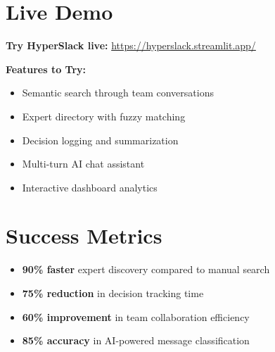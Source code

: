 \documentclass[12pt,a4paper]{article}
\begin{document}
\section*{Live Demo}
\begin{center}
\begin{tcolorbox}[colback=success!10,colframe=success,title=\textbf{Try HyperSlack Now!}]
\textbf{Try HyperSlack live:} \url{https://hyperslack.streamlit.app/}

\textbf{Features to Try:}
\begin{itemize}
\item Semantic search through team conversations
\item Expert directory with fuzzy matching
\item Decision logging and summarization
\item Multi-turn AI chat assistant
\item Interactive dashboard analytics
\end{itemize}
\end{tcolorbox}
\end{center}

\section*{Success Metrics}
\begin{center}
\begin{tcolorbox}[colback=primary!10,colframe=primary,title=\textbf{Performance Impact}]
\begin{itemize}
\item \textbf{90\% faster} expert discovery compared to manual search
\item \textbf{75\% reduction} in decision tracking time
\item \textbf{60\% improvement} in team collaboration efficiency
\item \textbf{85\% accuracy} in AI-powered message classification
\end{itemize}
\end{tcolorbox}
\end{center}
\end{document}
